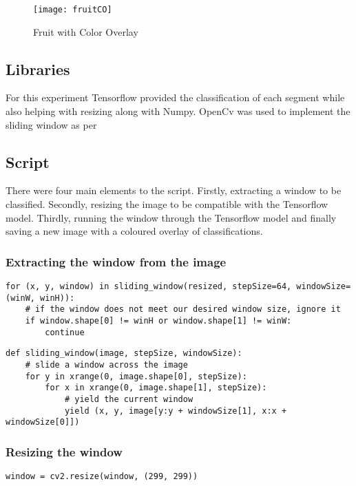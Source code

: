 \begin{figure}
    \texttt{[image: fruitCO]}
    \caption{Fruit with Color Overlay}
    \label{fig:fruitOverlay}
\end{figure}

\subsection*{Libraries}
For this experiment Tensorflow provided the classification of each segment while
also helping with resizing along with Numpy. OpenCv was used to implement the
sliding window as per \parencite{slidingWindowTut}

\subsection*{Script}
There were four main elements to the script. Firstly, extracting a window to be
classified. Secondly, resizing the image to be compatible with the Tensorflow
model. Thirdly, running the window through the Tensorflow model and finally
saving a new image with a coloured overlay of classifications.

\subsubsection*{Extracting the window from the image}
\begin{lstlisting}[style=Python]
for (x, y, window) in sliding_window(resized, stepSize=64, windowSize=(winW, winH)):
	# if the window does not meet our desired window size, ignore it
	if window.shape[0] != winH or window.shape[1] != winW:
		continue
\end{lstlisting}


\begin{lstlisting}[style=Python]
def sliding_window(image, stepSize, windowSize):
	# slide a window across the image
	for y in xrange(0, image.shape[0], stepSize):
		for x in xrange(0, image.shape[1], stepSize):
			# yield the current window
			yield (x, y, image[y:y + windowSize[1], x:x + windowSize[0]])
\end{lstlisting}

\subsubsection*{Resizing the window}
\begin{lstlisting}[style=Python]
window = cv2.resize(window, (299, 299))
\end{lstlisting}

